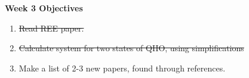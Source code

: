 \documentclass{article}
\begin{document}
\Large{\textbf{Week 3 Objectives}}
\\
\begin{enumerate}
    \item \sout{Read REE paper.}
    \item\sout{Calculate system for two states of QHO, using simplifications}
    \item {Make a list of 2-3 new papers, found through references.}


\end{enumerate}
\end{document}
